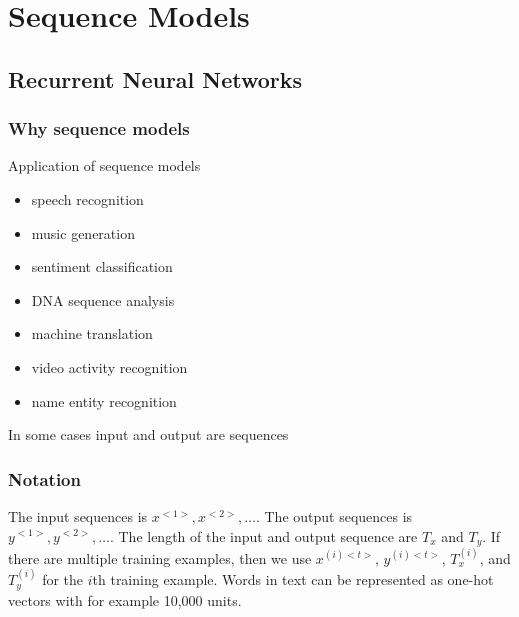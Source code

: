 \documentclass{article}
\begin{document}
\section{Sequence Models}
\subsection{Recurrent Neural Networks}
\subsubsection{Why sequence models}
Application of sequence models
\begin{itemize}
  \item speech recognition
  \item music generation
  \item sentiment classification
  \item DNA sequence analysis
  \item machine translation
  \item video activity recognition
  \item name entity recognition
\end{itemize}
In some cases input and output are sequences

\subsubsection{Notation}
The input sequences is $x^{<1>}, x^{<2>}, \ldots$.
The output sequences is $y^{<1>}, y^{<2>}, \ldots$.
The length of the input and output sequence are $T_x$ and $T_y$.
If there are multiple training examples, then we use $x^{(i)<t>}$, $y^{(i)<t>}$, $T_x^{(i)}$, and $T_y^{(i)}$
for the $i$th training example.
Words in text can be represented as one-hot vectors with for example 10,000 units.
\end{document}
